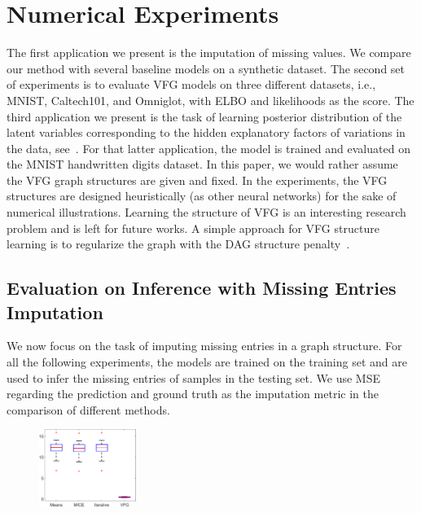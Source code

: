 \documentclass[twoside]{article}
\begin{document}
\section{Numerical Experiments}\label{sec:numerical}
The first  application we present is the imputation of missing values. We compare our method with several baseline models  on a synthetic dataset.
The second set of experiments is to evaluate VFG models on three different datasets, i.e.,  MNIST, Caltech101, and Omniglot, with ELBO and likelihoods as the score.  
The third application we present is the task of learning posterior distribution of the latent variables corresponding to the hidden explanatory factors of variations in the data, see~\cite{bengio2013representation}.
For that latter application, the model is trained and evaluated on the MNIST handwritten digits dataset.
 In this paper,  we would rather assume the VFG graph structures are given and fixed.  In the experiments, the VFG structures are designed heuristically (as other neural networks) for the sake of numerical illustrations.  Learning the structure of VFG is an interesting research problem and is left for future works. A simple approach for VFG structure learning is to regularize the graph with the DAG structure penalty~\cite{Zheng2018,wehenkel2021graphical}.
\subsection{Evaluation on Inference with Missing Entries Imputation}%
We now focus on the task of imputing missing entries in a graph structure.
For all the following experiments, the models are trained on the training set and are used to infer the missing entries of samples in the testing set. We use MSE  regarding the prediction and ground truth as the imputation metric in the comparison of different methods. 
\begin{figure}[H]
  \centering
       \includegraphics[width=0.28\textwidth]{fig/sim_box.eps}
    \label{fig:sim}
\end{figure}
\end{document}
